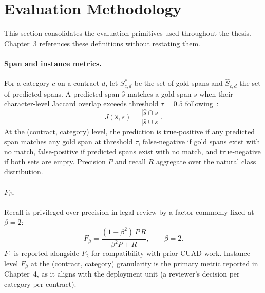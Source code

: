 \section{Evaluation Methodology}\label{sec:lit:eval}

This section consolidates the evaluation primitives used throughout the thesis.
Chapter~3 references these definitions without restating them.

\paragraph{Span and instance metrics.}
For a category $c$ on a contract $d$, let $S^*_{c,d}$ be the set of gold spans and
$\hat{S}_{c,d}$ the set of predicted spans. A predicted span $\hat{s}$ matches a gold
span $s$ when their character-level Jaccard overlap exceeds threshold $\tau{=}0.5$
following~\cite{hendrycks2021cuad}:
%
\begin{equation}\label{eq:jaccard}
  J(\hat{s}, s) = \frac{|\hat{s} \cap s|}{|\hat{s} \cup s|}.
\end{equation}
%
At the (contract, category) level, the prediction is true-positive if any predicted
span matches any gold span at threshold $\tau$, false-negative if gold spans exist
with no match, false-positive if predicted spans exist with no match, and true-negative
if both sets are empty. Precision $P$ and recall $R$ aggregate over the natural class
distribution.

\paragraph{$F_\beta$.}
Recall is privileged over precision in legal review by a factor commonly fixed at
$\beta{=}2$:
%
\begin{equation}\label{eq:fbeta}
  F_\beta = \frac{(1+\beta^2)\,P\,R}{\beta^2 P + R}, \qquad \beta=2.
\end{equation}
%
$F_1$ is reported alongside $F_2$ for compatibility with prior CUAD work.
Instance-level $F_\beta$ at the (contract, category) granularity is the primary
metric reported in Chapter~4, as it aligns with the deployment unit (a reviewer's
decision per category per contract).


